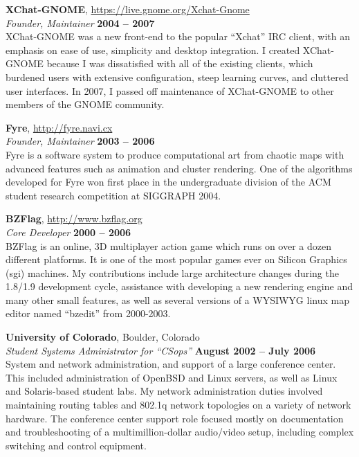 \documentclass[margin,line]{resume}
\begin{document}
\begin{resume}
    {\bf XChat-GNOME}, \href{https://live.gnome.org/Xchat-Gnome}{https://live.gnome.org/Xchat-Gnome} \vspace{2mm}\\\vspace{1mm}%
    {\sl Founder, Maintainer} \hfill {\bf 2004 -- 2007}\\
    XChat-GNOME was a new front-end to the popular ``Xchat'' IRC client, with an
    emphasis on ease of use, simplicity and desktop integration. I created
    XChat-GNOME because I was dissatisfied with all of the existing clients,
    which burdened users with extensive configuration, steep learning curves,
    and cluttered user interfaces. In 2007, I passed off maintenance of
    XChat-GNOME to other members of the GNOME community.

    {\bf Fyre}, \href{http://fyre.navi.cx}{http://fyre.navi.cx} \vspace{2mm}\\\vspace{1mm}%
    {\sl Founder, Maintainer} \hfill {\bf 2003 -- 2006}\\
    Fyre is a software system to produce computational art from chaotic maps
    with advanced features such as animation and cluster rendering. One of the
    algorithms developed for Fyre won first place in the undergraduate division
    of the ACM student research competition at SIGGRAPH 2004.

    \ifcv
        {\bf BZFlag}, \href{http://www.bzflag.org}{http://www.bzflag.org} \vspace{2mm}\\\vspace{1mm}%
        {\sl Core Developer} \hfill {\bf 2000 -- 2006}\\
        BZFlag is an online, 3D multiplayer action game which runs on over a dozen
        different platforms. It is one of the most popular games ever on Silicon
        Graphics (sgi) machines. My contributions include large architecture changes
        during the 1.8/1.9 development cycle, assistance with developing a new
        rendering engine and many other small features, as well as several versions
        of a WYSIWYG linux map editor named “bzedit” from 2000-2003.

        {\bf University of Colorado}, Boulder, Colorado \vspace{2mm}\\\vspace{1mm}%
        {\sl Student Systems Administrator for ``CSops''} \hfill {\bf August 2002 -- July 2006}\\
        System and network administration, and support of a large conference
        center. This included administration of OpenBSD and Linux servers, as well
        as Linux and Solaris-based student labs. My network administration duties
        involved maintaining routing tables and 802.1q network topologies on a
        variety of network hardware. The conference center support role focused
        mostly on documentation and troubleshooting of a multimillion-dollar
        audio/video setup, including complex switching and control equipment.


\end{resume}
\end{document}
